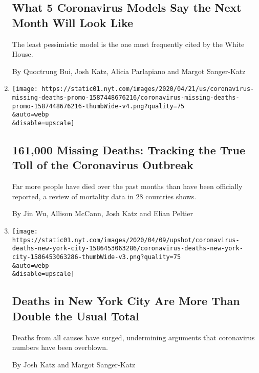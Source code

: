 \begin{enumerate}
  \hypertarget{what-5-coronavirus-models-say-the-next-month-will-look-like}{%
  \subsection{What 5 Coronavirus Models Say the Next Month Will Look
  Like}\label{what-5-coronavirus-models-say-the-next-month-will-look-like}}

  The least pessimistic model is the one most frequently cited by the
  White House.

  By Quoctrung Bui, Josh Katz, Alicia Parlapiano and Margot Sanger-Katz
\item
  \href{/interactive/2020/04/21/world/coronavirus-missing-deaths.html}{}

  \texttt{[image: https://static01.nyt.com/images/2020/04/21/us/coronavirus-missing-deaths-promo-1587448676216/coronavirus-missing-deaths-promo-1587448676216-thumbWide-v4.png?quality=75\\\&auto=webp\\\&disable=upscale]}

  \hypertarget{161000-missing-deaths-tracking-the-true-toll-of-the-coronavirus-outbreak}{%
  \subsection{161,000 Missing Deaths: Tracking the True Toll of the
  Coronavirus
  Outbreak}\label{161000-missing-deaths-tracking-the-true-toll-of-the-coronavirus-outbreak}}

  Far more people have died over the past months than have been
  officially reported, a review of mortality data in 28 countries shows.

  By Jin Wu, Allison McCann, Josh Katz and Elian Peltier
\item
  \href{/interactive/2020/04/10/upshot/coronavirus-deaths-new-york-city.html}{}

  \texttt{[image: https://static01.nyt.com/images/2020/04/09/upshot/coronavirus-deaths-new-york-city-1586453063286/coronavirus-deaths-new-york-city-1586453063286-thumbWide-v3.png?quality=75\\\&auto=webp\\\&disable=upscale]}

  \hypertarget{deaths-in-new-york-city-are-more-than-double-the-usual-total}{%
  \subsection{Deaths in New York City Are More Than Double the Usual
  Total}\label{deaths-in-new-york-city-are-more-than-double-the-usual-total}}

  Deaths from all causes have surged, undermining arguments that
  coronavirus numbers have been overblown.

  By Josh Katz and Margot Sanger-Katz
\end{enumerate}


